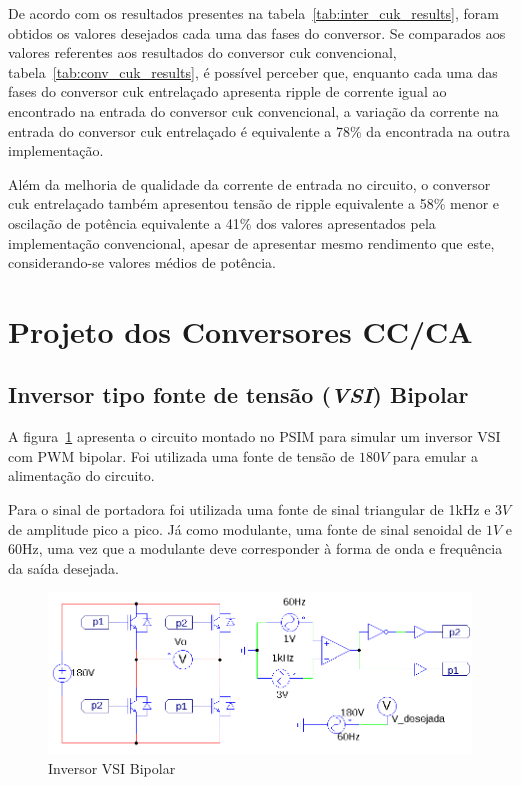 \documentclass[
	12pt,				%
	openany,
	onseside,
	a4paper,			%
	english,			%
	french,				%
	spanish,			%
	brazil,				%
	]{abntex2}
\begin{document}
De acordo com os resultados presentes na tabela~\ref{tab:inter_cuk_results}, foram obtidos os valores desejados cada uma das fases do conversor. Se comparados aos valores referentes aos resultados do conversor cuk convencional, tabela~\ref{tab:conv_cuk_results}, é possível perceber que, enquanto cada uma das fases do conversor cuk entrelaçado apresenta ripple de corrente igual ao encontrado na entrada do conversor cuk convencional, a variação da corrente na entrada do conversor cuk entrelaçado é equivalente a 78\% da encontrada na outra implementação.

Além da melhoria de qualidade da corrente de entrada no circuito, o conversor cuk entrelaçado também apresentou tensão de ripple equivalente a 58\% menor e oscilação de potência equivalente a 41\% dos valores apresentados pela implementação convencional, apesar de apresentar mesmo rendimento que este, considerando-se valores médios de potência.

\section{Projeto dos Conversores CC/CA} \label{sec:met_conv_cc_ca}

\subsection{Inversor tipo fonte de tensão (\textit{VSI}) Bipolar}

A figura~\ref{fig:VSI_bip_circ} apresenta o circuito montado no PSIM para simular um inversor VSI com PWM bipolar. Foi utilizada uma fonte de tensão de $180V$ para emular a alimentação do circuito.

Para o sinal de portadora foi utilizada uma fonte de sinal triangular de 1kHz e $3V$ de amplitude pico a pico. Já como modulante, uma fonte de sinal senoidal de $1V$ e 60Hz, uma vez que a modulante deve corresponder à forma de onda e frequência da saída desejada.

\begin{figure}[htpb]%
	\centering%
		\includegraphics[width=0.8 \linewidth]{vsi_bipolar_psim_circ}
		\caption{Inversor VSI Bipolar}
		\label{fig:VSI_bip_circ}
\end{figure}
\end{document}
